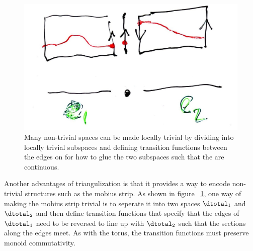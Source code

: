 \documentclass[../main.tex]{subfiles}
\begin{document}
\begin{figure}[H]
    \includegraphics[width=\textwidth]{figures/math/transition_functions.png}
    \caption{Many non-trivial spaces can be made locally trivial by dividing \dtotal into locally trivial subspaces and defining transition functions between the edges on \dbase for how to glue the two subspaces such that the \dsection are continuous.}
    \label{fig:data_base_transition}
\end{figure}
Another advantages of triangulization is that it provides a way to encode non-trivial structures such as the mobius strip\cite{MobiusStripNLab}. As shown in figure ~\ref{fig:data_base_transition}, one way of making the mobius strip trivial is to seperate it into two spaces $\dtotal_1$ and $\dtotal_2$ and then define transition functions that specify that the edges of $\dtotal_1$ need to be reversed to line up with $\dtotal_2$ such that the sections along the edges meet. As with the torus, the transition functions must preserve monoid commutativity. 
\end{document}
